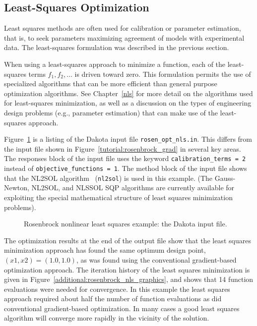 \subsection{Least-Squares Optimization}\label{additional:rosenbrock:examples:nonlinear}

Least squares methods are often used for calibration or parameter
estimation, that is, to seek parameters maximizing agreement of models
with experimental data. The least-squares formulation was described in 
the previous section.

When using a least-squares approach to minimize a function, each of the
least-squares terms $f_1, f_2,\ldots$ is driven toward zero. This
formulation permits the use of specialized algorithms that can be more
efficient than general purpose optimization algorithms. See
Chapter~\ref{nls} for more detail on the algorithms used for least-squares
minimization, as well as a discussion on the types of
engineering design problems (e.g., parameter estimation) that can make
use of the least-squares approach.

Figure~\ref{additional:rosenbrock_nls} is a listing of the Dakota input
file \texttt{rosen\_opt\_nls.in}. This differs from the input
file shown in Figure~\ref{tutorial:rosenbrock_grad} in several key
areas. The responses block of the input file uses the keyword
\texttt{calibration\_terms = 2} instead of
\texttt{objective\_functions = 1}.
The method block of the input file shows that the NL2SOL
algorithm~\cite{Den81} (\texttt{nl2sol}) is used in this example. (The
Gauss-Newton, NL2SOL, and NLSSOL SQP algorithms are currently
available for exploiting the special mathematical structure of least
squares minimization problems).

\begin{figure}[ht!]
  \centering
  \begin{bigbox}
    \begin{small}
    \end{small}
  \end{bigbox}
  \caption{Rosenbrock nonlinear least squares example: the Dakota input file.}
  \label{additional:rosenbrock_nls}
\end{figure}

The optimization results at the end of the output file show that the least
squares minimization approach has found the same optimum design point,
$(x1,x2) = (1.0,1.0)$, as was found using the conventional
gradient-based optimization approach. The iteration history of the
least squares minimization is given in
Figure~\ref{additional:rosenbrock_nls_graphics}, and shows that 14
function evaluations were needed for convergence. In this example the
least squares approach required about half the number of function
evaluations as did conventional gradient-based optimization.
In many cases a good least squares algorithm will converge more rapidly
in the vicinity of the solution.

